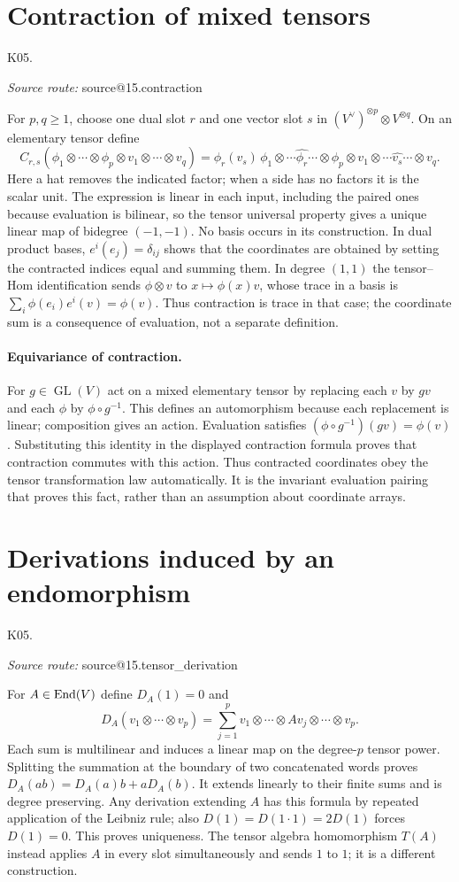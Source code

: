 \documentclass[11pt,a4paper]{book}
\makeatletter
\theoremstyle{definition}\newtheorem{definition}[theorem]{Definition}
\theoremstyle{remark}\newtheorem{remark}[theorem]{Remark}
\newcommand{\Kentry}[2]{\section{#2}\label{k:#1}\noindent\textsf{\small K05.\detokenize{#1}}\par
  \begingroup\small\color{black!65}\textit{Source route: }\csname source@#1\endcsname\par\endgroup}
\makeatother
\begin{document}
\Kentry{15.contraction}{Contraction of mixed tensors}
For $p,q\ge1$, choose one dual slot $r$ and one vector slot $s$ in $(V^\vee)^{\otimes p}\otimes V^{\otimes q}$. On an elementary tensor define
\[
 C_{r,s}(\phi_1\otimes\cdots\otimes\phi_p\otimes v_1\otimes\cdots\otimes v_q)
 =\phi_r(v_s)\,
 \phi_1\otimes\cdots\widehat{\phi_r}\cdots\otimes\phi_p
 \otimes v_1\otimes\cdots\widehat{v_s}\cdots\otimes v_q.
\]
Here a hat removes the indicated factor; when a side has no factors it is the scalar unit. The expression is linear in each input, including the paired ones because evaluation is bilinear, so the tensor universal property gives a unique linear map of bidegree $(-1,-1)$. No basis occurs in its construction. In dual product bases, $e^i(e_j)=\delta_{ij}$ shows that the coordinates are obtained by setting the contracted indices equal and summing them. In degree $(1,1)$ the tensor--Hom identification sends $\phi\otimes v$ to $x\mapsto\phi(x)v$, whose trace in a basis is $\sum_i\phi(e_i)e^i(v)=\phi(v)$. Thus contraction is trace in that case; the coordinate sum is a consequence of evaluation, not a separate definition.


\paragraph{Equivariance of contraction.}
For $g\in\operatorname{GL}(V)$ act on a mixed elementary tensor by replacing each $v$ by $gv$ and each $\phi$ by $\phi\circ g^{-1}$. This defines an automorphism because each replacement is linear; composition gives an action. Evaluation satisfies $(\phi\circ g^{-1})(gv)=\phi(v)$. Substituting this identity in the displayed contraction formula proves that contraction commutes with this action. Thus contracted coordinates obey the tensor transformation law automatically. It is the invariant evaluation pairing that proves this fact, rather than an assumption about coordinate arrays.

\Kentry{15.tensor_derivation}{Derivations induced by an endomorphism}
For $A\in\operatorname{End}(V)$ define $D_A(1)=0$ and
\[
 D_A(v_1\otimes\cdots\otimes v_p)
 =\sum_{j=1}^p v_1\otimes\cdots\otimes Av_j\otimes\cdots\otimes v_p.
\]
Each sum is multilinear and induces a linear map on the degree-$p$ tensor power. Splitting the summation at the boundary of two concatenated words proves $D_A(ab)=D_A(a)b+aD_A(b)$. It extends linearly to their finite sums and is degree preserving. Any derivation extending $A$ has this formula by repeated application of the Leibniz rule; also $D(1)=D(1\cdot1)=2D(1)$ forces $D(1)=0$. This proves uniqueness. The tensor algebra homomorphism $T(A)$ instead applies $A$ in every slot simultaneously and sends $1$ to $1$; it is a different construction.
\end{document}

